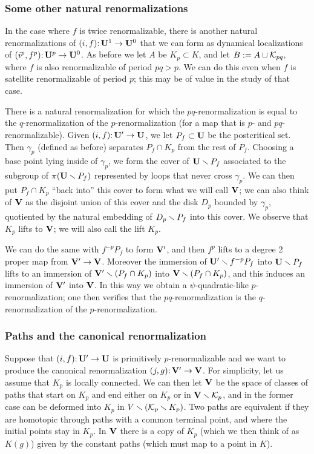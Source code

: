 \subsubsection{Some other natural renormalizations} \label{satellite}

In the case where $f$ is twice renormalizable,
there is another natural renormalizations of $(i, f)\mathpunct: \mathbf U^1 \to \mathbf U^0$ 
that we can form as dynamical localizations of $(i^p, f^p)\mathpunct: \mathbf U^p \to \mathbf U^0$.
As before we let $A$ be $K_p \subset K$,
and let $B := A \cup {\mathcal K}_{pq}$, where $f$ is also renormalizable of period $pq > p$.
We can do this even when $f$ is satellite renormalizable of period $p$;
this may be of value in the study of that case. 

There is a natural renormalization for which the $pq$-renormalization is equal to the $q$-renormalization of the $p$-renormalization (for a map that is $p$- and $pq$-renormalizable). Given $(i, f)\mathpunct: \mathbf U'\to \mathbf U$, we let $P_f \subset \mathbf U$ be the postcritical set. Then $\gamma_p$ (defined as before) separates $P_f \cap K_p$ from the rest of $P_f$. Choosing a base point lying inside of $\gamma_p$, we form the cover of $\mathbf U \smallsetminus P_f$ associated to the subgroup of $\pi(\mathbf U \smallsetminus P_f)$ represented by loops that never cross $\gamma_p$. We can then put $P_f \cap K_p$ ``back into'' this cover to form what we will call ${\mathbf{V}}$; we can also think of ${\mathbf{V}}$ as the disjoint union of this cover and the disk $D_p$ bounded by $\gamma_p$, quotiented by the natural embedding of $D_p \smallsetminus P_f$ into this cover. We observe that $K_p$ lifts to ${\mathbf{V}}$; we will also call the lift $K_p$.

We can do the same with $f^{-p}P_f$ to form ${\mathbf{V}}'$, and then $f^p$ lifts to a degree 2 proper map from ${\mathbf{V}}' \to {\mathbf{V}}$. Moreover the immersion of $\mathbf U' \smallsetminus f^{-p}P_f$ into $\mathbf U \smallsetminus P_f$ lifts to an immersion of ${\mathbf{V}}' \smallsetminus (P_f \cap K_p)$ into ${\mathbf{V}} \smallsetminus (P_f \cap K_p)$, and this induces an immersion of ${\mathbf{V}}'$ into ${\mathbf{V}}$. In this way we obtain a $\psi$-quadratic-like $p$-renormalization; one then verifies that the $pq$-renormalization is the $q$-renormalization of the $p$-renormalization. 






\subsubsection{Paths and the canonical renormalization}
Suppose that $(i, f)\mathpunct: \mathbf U' \to \mathbf U$ is primitively $p$-renormalizable and we want to produce the canonical renormalization $(j, g)\mathpunct: {\mathbf{V}}' \to {\mathbf{V}}$.
For simplicity, let us assume that $K_p$ is locally connected. 
We can then let ${\mathbf{V}}$ be the space of classes of paths that start on $K_p$ and end either on $K_p$ or in ${\mathbf{V}} \smallsetminus {\mathcal K}_p$, and in the former case can be deformed into $K_p$ in $V \smallsetminus ({\mathcal K}_p \smallsetminus K_p)$. 
Two paths are equivalent if they are homotopic through paths with a common terminal point, and where the initial points stay in $K_p$. 
In ${\mathbf{V}}$ there is a copy of $K_p$ (which we then think of as $K(g)$) given by the constant paths (which must map to a point in $K$).

